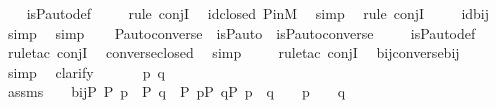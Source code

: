 \begin{isabellebody}
%
\isadelimproof
\ \ %
\endisadelimproof
%
\isatagproof
{}\isamarkupfalse%
\ is{\isacharunderscore}{\kern0pt}P{\isacharunderscore}{\kern0pt}auto{\isacharunderscore}{\kern0pt}def\ \isanewline
\ \ \isamarkupfalse%
\ {\isacharparenleft}{\kern0pt}rule\ conjI{\isacharparenright}{\kern0pt}\ \isamarkupfalse%
\ id{\isacharunderscore}{\kern0pt}closed\ P{\isacharunderscore}{\kern0pt}in{\isacharunderscore}{\kern0pt}M\ \isamarkupfalse%
\ simp\ \isamarkupfalse%
\ {\isacharparenleft}{\kern0pt}rule\ conjI{\isacharparenright}{\kern0pt}\ \isanewline
\ \ \isamarkupfalse%
\ id{\isacharunderscore}{\kern0pt}bij\ \isamarkupfalse%
\ simp\ \isamarkupfalse%
\ simp\ \isamarkupfalse%
%
\endisatagproof
{\isafoldproof}%
%
\isadelimproof
\ \isanewline
%
\endisadelimproof
\isanewline
{}\isamarkupfalse%
\ P{\isacharunderscore}{\kern0pt}auto{\isacharunderscore}{\kern0pt}converse\ {\isacharcolon}{\kern0pt}\ {\isachardoublequoteopen}is{\isacharunderscore}{\kern0pt}P{\isacharunderscore}{\kern0pt}auto{\isacharparenleft}{\kern0pt}{\isasympi}{\isacharparenright}{\kern0pt}\ {\isasymLongrightarrow}\ is{\isacharunderscore}{\kern0pt}P{\isacharunderscore}{\kern0pt}auto{\isacharparenleft}{\kern0pt}converse{\isacharparenleft}{\kern0pt}{\isasympi}{\isacharparenright}{\kern0pt}{\isacharparenright}{\kern0pt}{\isachardoublequoteclose}\ \isanewline
%
\isadelimproof
\ \ %
\endisadelimproof
%
\isatagproof
{}\isamarkupfalse%
\ is{\isacharunderscore}{\kern0pt}P{\isacharunderscore}{\kern0pt}auto{\isacharunderscore}{\kern0pt}def\ \isamarkupfalse%
\ {\isacharparenleft}{\kern0pt}rule{\isacharunderscore}{\kern0pt}tac\ conjI{\isacharparenright}{\kern0pt}\ \isamarkupfalse%
\ converse{\isacharunderscore}{\kern0pt}closed\ \isamarkupfalse%
\ simp\ \isanewline
\ \ \isamarkupfalse%
\ {\isacharparenleft}{\kern0pt}rule{\isacharunderscore}{\kern0pt}tac\ conjI{\isacharparenright}{\kern0pt}\ \isamarkupfalse%
\ bij{\isacharunderscore}{\kern0pt}converse{\isacharunderscore}{\kern0pt}bij\ \isamarkupfalse%
\ simp\ \isamarkupfalse%
\ {\isacharparenleft}{\kern0pt}clarify{\isacharparenright}{\kern0pt}\ \isanewline
{}\isamarkupfalse%
\ {\isacharminus}{\kern0pt}\isanewline
\ \ \isamarkupfalse%
\ p\ q\ \isanewline
\ \ \isamarkupfalse%
\ assms\ {\isacharcolon}{\kern0pt}\ {\isachardoublequoteopen}{\isasympi}\ {\isasymin}\ bij{\isacharparenleft}{\kern0pt}P{\isacharcomma}{\kern0pt}\ P{\isacharparenright}{\kern0pt}{\isachardoublequoteclose}\ {\isachardoublequoteopen}p\ {\isasymin}\ P{\isachardoublequoteclose}\ {\isachardoublequoteopen}q\ {\isasymin}\ P{\isachardoublequoteclose}\ {\isachardoublequoteopen}{\isasymforall}p{\isasymin}P{\isachardot}{\kern0pt}\ {\isasymforall}q{\isasymin}P{\isachardot}{\kern0pt}\ p\ {\isasympreceq}\ q\ {\isasymlongleftrightarrow}\ {\isasympi}\ {\isacharbackquote}{\kern0pt}\ p\ {\isasympreceq}\ {\isasympi}\ {\isacharbackquote}{\kern0pt}\ q{\isachardoublequoteclose}\ \isanewline

\end{isabellebody}
